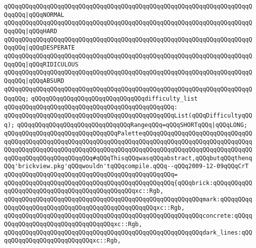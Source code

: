 \verb|qQQqqQQqqQQqqQQqqQQqqQQqqQQqqQQqqQQqqQQqqQQqqQQqqQQqqQQqqQQqqQQqqQQqqQQqqQQq|\verb#|qQQqNORMAL#\newline
\verb|qQQqqQQqqQQqqQQqqQQqqQQqqQQqqQQqqQQqqQQqqQQqqQQqqQQqqQQqqQQqqQQqqQQqqQQqqQQq|\verb#|qQQqHARD#\newline
\verb|qQQqqQQqqQQqqQQqqQQqqQQqqQQqqQQqqQQqqQQqqQQqqQQqqQQqqQQqqQQqqQQqqQQqqQQqqQQq|\verb#|qQQqDESPERATE#\newline
\verb|qQQqqQQqqQQqqQQqqQQqqQQqqQQqqQQqqQQqqQQqqQQqqQQqqQQqqQQqqQQqqQQqqQQqqQQqqQQq|\verb#|qQQqRIDICULOUS#\newline
\verb|qQQqqQQqqQQqqQQqqQQqqQQqqQQqqQQqqQQqqQQqqQQqqQQqqQQqqQQqqQQqqQQqqQQqqQQqqQQq|\verb#|qQQqABSURD#\newline
\verb|qQQqqQQqqQQqqQQqqQQqqQQqqQQqqQQqqQQqqQQqqQQqqQQqqQQqqQQqqQQqqQQqqQQqqQQqqQQq;|\newline
\newline
\verb|qQQqqQQqqQQqqQQqqQQqqQQqqQQqqQQqdifficulty_list|\newline
\verb|qQQqqQQqqQQqqQQqqQQqqQQqqQQqqQQqqQQqqQQqqQQqqQQq:|\newline
\verb|qQQqqQQqqQQqqQQqqQQqqQQqqQQqqQQqqQQqqQQqqQQqqQQqList(qQQqDifficultyqQQq);|\newline
\newline
\verb|qQQqqQQqqQQqqQQqqQQqqQQqqQQqqQQqRangeqQQq=qQQqSHORTqQQq|\verb#|qQQqLONG;#\newline
\newline
\verb|qQQqqQQqqQQqqQQqqQQqqQQqqQQqqQQqPaletteqQQqqQQqqQQqqQQqqQQqqQQqqQQqqQQqqQQqqQQqqQQqqQQqqQQqqQQqqQQqqQQqqQQqqQQqqQQqqQQqqQQqqQQqqQQqqQQqqQQqqQQqqQQqqQQqqQQqqQQqqQQqqQQqqQQqqQQqqQQqqQQqqQQqqQQqqQQqqQQqqQQqqQQqqQQqqQQqqQQqqQQqqQQqqQQqqQQq#qQQqThisqQQqwasqQQqabstract,qQQqbutqQQqthenqQQq'brickview.pkg'qQQqwouldn'tqQQqcompile.qQQq--qQQq2009-12-09qQQqCrT|\newline
\verb|qQQqqQQqqQQqqQQqqQQqqQQqqQQqqQQqqQQqqQQqqQQqqQQq=|\newline
\verb|qQQqqQQqqQQqqQQqqQQqqQQqqQQqqQQqqQQqqQQqqQQqqQQq{qQQqbrick:qQQqqQQqqQQqqQQqqQQqqQQqqQQqqQQqqQQqqQQqqQQqqQQqxc::Rgb,|\newline
\verb|qQQqqQQqqQQqqQQqqQQqqQQqqQQqqQQqqQQqqQQqqQQqqQQqqQQqqQQqmark:qQQqqQQqqQQqqQQqqQQqqQQqqQQqqQQqqQQqqQQqqQQqqQQqqQQqxc::Rgb,|\newline
\verb|qQQqqQQqqQQqqQQqqQQqqQQqqQQqqQQqqQQqqQQqqQQqqQQqqQQqqQQqconcrete:qQQqqQQqqQQqqQQqqQQqqQQqqQQqqQQqqQQqxc::Rgb,|\newline
\verb|qQQqqQQqqQQqqQQqqQQqqQQqqQQqqQQqqQQqqQQqqQQqqQQqqQQqqQQqdark_lines:qQQqqQQqqQQqqQQqqQQqqQQqqQQqxc::Rgb,|\newline
